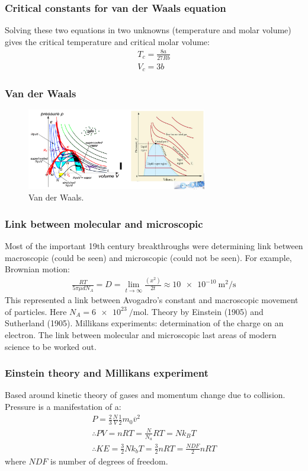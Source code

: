 \subsubsection{Critical constants for van der Waals equation}
Solving these two equations in two unknowns (temperature and molar volume) gives the critical temperature and critical molar volume:
\begin{gather}
	T_c = \frac{8a}{27Rb}\\
	V_c = 3b
\end{gather}
\subsubsection{Van der Waals}
\begin{figure}[H]
	\centering
	\includegraphics[width = 0.7\textwidth]{./img/figure18.png}
	\caption{Van der Waals.}
\end{figure}
\subsubsection{Link between molecular and microscopic}
Most of the important 19th century breakthroughs were determining link between macroscopic (could be seen) and microscopic (could not be seen). For example, Brownian motion:
\begin{gather} 
	\frac{RT}{5\pi\mu dN_A} = D = \lim_{t\rightarrow \infty} \frac{\left(x^2\right)}{2t} \approx \SI{10e-10}{\meter\squared\per\second}
\end{gather}
This represented a link between Avogadro's constant and macroscopic movement of particles. Here $N_A = \SI{6e23}{\per\mole}$. Theory by Einstein (1905) and Sutherland (1905). Millikans experiments: determination of the charge on an electron. The link between molecular and microscopic last areas of modern science to be worked out.
\subsubsection{Einstein theory and Millikans experiment}
Based around kinetic theory of gases and momentum change due to collision. Pressure is a manifestation of a:
\begin{gather}
	P = \frac{2}{3}\frac{N}{V}\frac{1}{2}m_0 \overline{v}^2\\
	\therefore PV = nRT = \frac{N}{N_a}RT = Nk_BT\\
	\therefore KE = \frac{3}{2}Nk_bT = \frac{3}{2}nRT = \frac{NDF}{2}nRT
\end{gather}
where $NDF$ is number of degrees of freedom.
